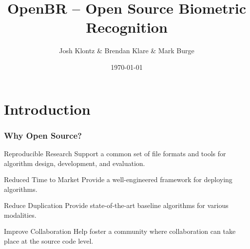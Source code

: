 \documentclass[12pt]{beamer}
\title[OpenBR]{OpenBR -- Open Source Biometric Recognition}
\author[J. Klontz \& B. Klare \& M. Burge]{Josh Klontz \& Brendan Klare \& Mark Burge}
\institute[]
{
\small
\emph{www.openbiometrics.org}
}
\date{\today}
\begin{document}
\begin{frame}
\titlepage
\end{frame}

\section{Introduction}
\begin{frame}
\frametitle{Why Open Source?}
\pause
\begin{block}{Reproducible Research}
Support a common set of file formats and tools for algorithm design, development, and evaluation.
\end{block}
\pause
\begin{block}{Reduced Time to Market}
Provide a well-engineered framework for deploying algorithms.
\end{block}
\pause
\begin{block}{Reduce Duplication}
Provide state-of-the-art baseline algorithms for various modalities.
\end{block}
\pause
\begin{block}{Improve Collaboration}
Help foster a community where collaboration can take place at the source code level.
\end{block}
\end{frame}
\end{document}
